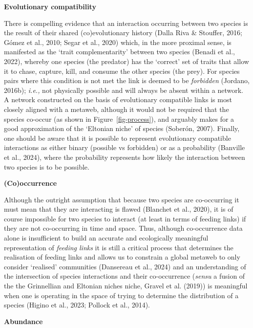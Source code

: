 \documentclass[
]{article}
\begin{document}
\textbf{Evolutionary compatibility}

There is compelling evidence that an interaction occurring between two
species is the result of their shared (co)evolutionary history (Dalla
Riva \& Stouffer, 2016; Gómez et al., 2010; Segar et al., 2020) which,
in the more proximal sense, is manifested as the `trait complementarity'
between two species (Benadi et al., 2022), whereby one species (the
predator) has the `correct' set of traits that allow it to chase,
capture, kill, and consume the other species (the prey). For species
pairs where this condition is not met the link is deemed to be
\emph{forbidden} (Jordano, 2016b); \emph{i.e.,} not physically possible
and will always be absent within a network. A network constructed on the
basis of evolutionary compatible links is most closely aligned with a
metaweb, although it would not be required that the species co-occur (as
shown in Figure~\ref{fig-process}), and arguably makes for a good
approximation of the `Eltonian niche' of species (Soberón, 2007).
Finally, one should be aware that it is possible to represent
evolutionary compatible interactions as either binary (possible vs
forbidden) or as a probability (Banville et al., 2024), where the
probability represents how likely the interaction between two species is
to be possible.

\textbf{(Co)occurrence}

Although the outright assumption that because two species are
co-occurring it must mean that they are interacting is flawed (Blanchet
et al., 2020), it is of course impossible for two species to interact
(at least in terms of feeding links) if they are not co-occurring in
time and space. Thus, although co-occurrence data alone is insufficient
to build an accurate and ecologically meaningful representation of
\emph{feeding links} it is still a critical process that determines the
realisation of feeding links and allows us to constrain a global metaweb
to only consider `realised' communities (Dansereau et al., 2024) and an
understanding of the intersection of species interactions and their
co-occurrence (\emph{sensu} a fusion of the the Grinnellian and Eltonian
niches niche, Gravel et al. (2019)) is meaningful when one is operating
in the space of trying to determine the distribution of a species
(Higino et al., 2023; Pollock et al., 2014).

\textbf{Abundance}
\end{document}
